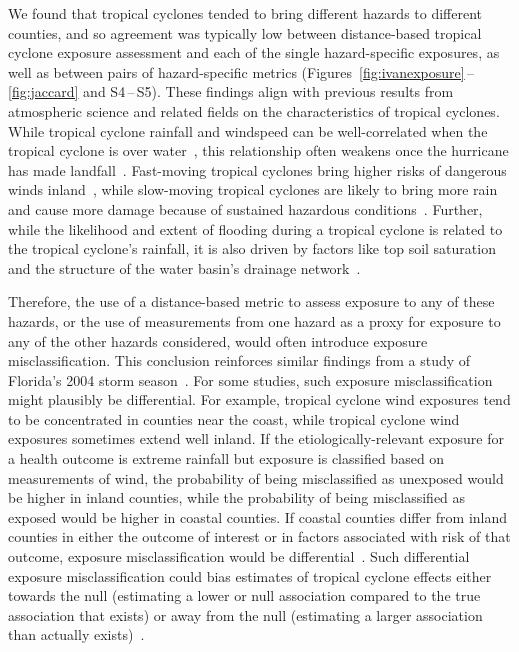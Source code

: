 We found that tropical cyclones tended to bring different hazards to different
counties, and so agreement was typically low between distance-based
tropical cyclone exposure assessment and each of the single hazard-specific
exposures, as well as between pairs of hazard-specific metrics
(Figures~\ref{fig:ivanexposure}\,--\,\ref{fig:jaccard} and S4\,--\,S5).  These
findings align with previous results from atmospheric science and related
fields on the characteristics of tropical cyclones. While tropical cyclone
rainfall and windspeed can be well-correlated when the tropical cyclone is over
water~\parencite{cerveny2000}, this relationship often weakens once the
hurricane has made landfall~\parencite{jiang2008}.  Fast-moving tropical
cyclones bring higher risks of dangerous winds inland~\parencite{kruk2010},
while slow-moving tropical cyclones are likely to bring more
rain~\parencite{rappaport2000} and cause more damage because of sustained
hazardous conditions~\parencite{rezapour2014}. Further, while the likelihood
and extent of flooding during a tropical cyclone is related to the tropical
cyclone's rainfall, it is also driven by factors like top soil saturation and
the structure of the water basin's drainage network~\parencite{chen2015,
rees2001}. 

Therefore, the use of a distance-based metric to assess exposure to any of
these hazards, or the use of measurements from one hazard as a proxy for
exposure to any of the other hazards considered, would often introduce exposure
misclassification. This conclusion reinforces similar findings from a study of
Florida's 2004 storm season~\parencite{grabich2015measuring}.  For some
studies, such exposure misclassification might plausibly be differential.  For
example, tropical cyclone wind exposures tend to be concentrated in counties
near the coast, while tropical cyclone wind exposures sometimes extend well
inland.  If the etiologically-relevant exposure for a health outcome is extreme
rainfall but exposure is classified based on measurements of wind, the
probability of being misclassified as unexposed would be higher in inland
counties, while the probability of being misclassified as exposed would be
higher in coastal counties. If coastal counties differ from inland counties in
either the outcome of interest or in factors associated with risk of that
outcome, exposure misclassification would be
differential~\parencite{savitz2016interpreting}.  Such differential exposure
misclassification could bias estimates of tropical cyclone effects either
towards the null (estimating a lower or null association compared to the true
association that exists) or away from the null (estimating a larger association
than actually exists)~\parencite{savitz2016interpreting, armstrong1998effect}.  

